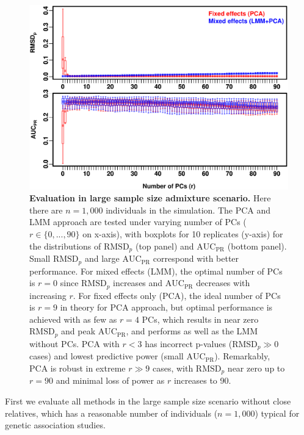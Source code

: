 \documentclass[11pt]{article}
\newcommand{\rmsd}{\text{RMSD}_p}
\newcommand{\auc}{\text{AUC}_\text{PR}}
\begin{document}
\begin{figure}[bp!]
  \centering
  \includegraphics[width=6in]{PCA_data/PCA_GCTApcs/boxplot_n_1000.pdf}
  \caption{
    {\bf Evaluation in large sample size admixture scenario.}
    Here there are $n = 1,000$ individuals in the simulation.
    The PCA and LMM approach are tested under varying number of PCs ($r \in \{0, ..., 90\}$ on x-axis), with boxplots for 10 replicates (y-axis) for the distributions of $\rmsd$ (top panel) and $\auc$ (bottom panel).
    Small $\rmsd$ and large $\auc$ correspond with better performance.
    For mixed effects (LMM), the optimal number of PCs is $r=0$ since $\rmsd$ increases and $\auc$ decreases with increasing $r$.
    For fixed effects only (PCA), the ideal number of PCs is $r = 9$ in theory for PCA approach, but optimal performance is achieved with as few as $r = 4$ PCs, which results in near zero $\rmsd$ and peak $\auc$, and performs as well as the LMM without PCs.
    PCA with $r < 3$ has incorrect p-values ($\rmsd \gg 0$ cases) and lowest predictive power (small $\auc$).
    Remarkably, PCA is robust in extreme $r \gg 9$ cases, with $\rmsd$ near zero up to $r = 90$ and minimal loss of power as $r$ increases to 90.
  }
  \label{fig:large_sample_size}
\end{figure}

First we evaluate all methods in the large sample size scenario without close relatives, which has a reasonable number of individuals ($n = 1,000$) typical for genetic association studies.
\end{document}
